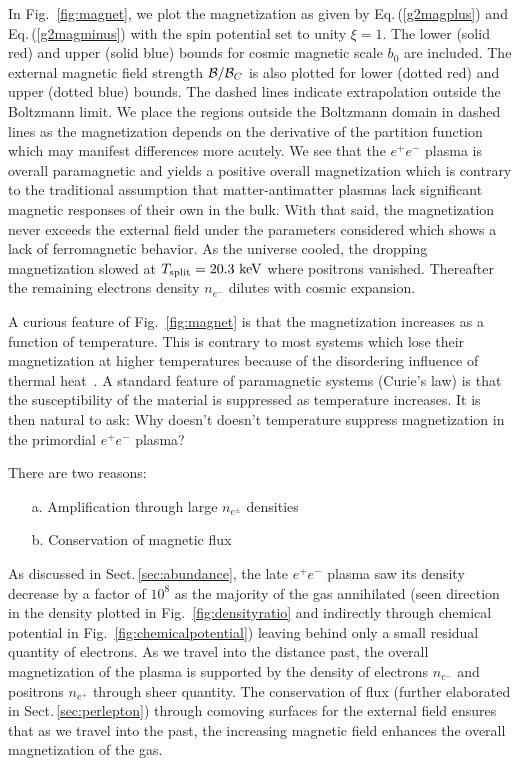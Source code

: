 \documentclass[reprint]{revtex4-2}
\newcommand*{\keV}{\text{ keV}}
\newcommand{\req}[1]{Eq.\,(\ref{#1})}
\newcommand{\rf}[1]{Fig.~{\ref{#1}}}
\newcommand{\rsec}[1]{Sect.\,{\ref{#1}}}
\begin{document}
In \rf{fig:magnet}, we plot the magnetization as given by \req{g2magplus} and \req{g2magminus} with the spin potential set to unity $\xi=1$. The lower (solid red) and upper (solid blue) bounds for cosmic magnetic scale $b_{0}$ are included. The external magnetic field strength ${\cal B}/{\cal B}_{C}$ is also plotted for lower (dotted red) and upper (dotted blue) bounds. The dashed lines indicate extrapolation outside the Boltzmann limit. We place the regions outside the Boltzmann domain in dashed lines as the magnetization depends on the derivative of the partition function which may manifest differences more acutely. We see that the $e^{+}e^{-}$ plasma is overall paramagnetic and yields a positive overall magnetization which is contrary to the traditional assumption that matter-antimatter plasmas lack significant magnetic responses of their own in the bulk. With that said, the magnetization never exceeds the external field under the parameters considered which shows a lack of ferromagnetic behavior. As the universe cooled, the dropping magnetization slowed at $T_{\rm split}=20.3\keV$ where positrons vanished. Thereafter the remaining electrons density $n_{e^{-}}$ dilutes with cosmic expansion.

A curious feature of \rf{fig:magnet} is that the magnetization increases as a function of temperature. This is contrary to most systems which lose their magnetization at higher temperatures because of the disordering influence of thermal heat~\cite{greiner2012thermodynamics}. A standard feature of paramagnetic systems (Curie's law) is that the susceptibility of the material is suppressed as temperature increases. It is then natural to ask: Why doesn't doesn't temperature suppress magnetization in the primordial $e^{+}e^{-}$ plasma?

There are two reasons:
\begin{itemize}
    \item[a.] Amplification through large $n_{e^{\pm}}$ densities
    \item[b.] Conservation of magnetic flux
\end{itemize}

As discussed in \rsec{sec:abundance}, the late $e^{+}e^{-}$ plasma saw its density decrease by a factor of $10^{8}$ as the majority of the gas annihilated (seen direction in the density plotted in \rf{fig:densityratio} and indirectly through chemical potential in \rf{fig:chemicalpotential}) leaving behind only a small residual quantity of electrons. As we travel into the distance past, the overall magnetization of the plasma is supported by the density of electrons $n_{e^{-}}$ and positrons $n_{e^{+}}$ through sheer quantity. The conservation of flux (further elaborated in \rsec{sec:perlepton}) through comoving surfaces for the external field ensures that as we travel into the past, the increasing magnetic field enhances the overall magnetization of the gas.
\end{document}

